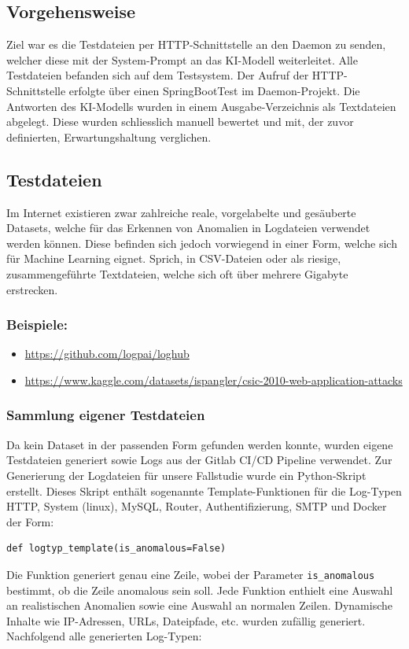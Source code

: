 \documentclass[a4paper,12pt]{report}
\begin{document}
    \subsection{Vorgehensweise}\label{subsec:vorgehensweise}
    Ziel war es die Testdateien per HTTP-Schnittstelle an den Daemon zu senden, welcher diese mit der System-Prompt an das KI-Modell weiterleitet.
    Alle Testdateien befanden sich auf dem Testsystem.
    Der Aufruf der HTTP-Schnittstelle erfolgte über einen SpringBootTest im Daemon-Projekt.
    Die Antworten des KI-Modells wurden in einem Ausgabe-Verzeichnis als Textdateien abgelegt.
    Diese wurden schliesslich manuell bewertet und mit, der zuvor definierten, Erwartungshaltung verglichen.

    \subsection{Testdateien}\label{subsec:testdateien}
    Im Internet existieren zwar zahlreiche reale, vorgelabelte und gesäuberte Datasets, welche für das Erkennen von Anomalien in Logdateien verwendet werden können.
    Diese befinden sich jedoch vorwiegend in einer Form, welche sich für Machine Learning eignet.
    Sprich, in CSV-Dateien oder als riesige, zusammengeführte Textdateien, welche sich oft über mehrere Gigabyte erstrecken.

    \subsubsection{Beispiele:}
    \begin{itemize}
        \item \url{https://github.com/logpai/loghub}
        \item \url{https://www.kaggle.com/datasets/ispangler/csic-2010-web-application-attacks}
    \end{itemize}

    \subsubsection{Sammlung eigener Testdateien}
    Da kein Dataset in der passenden Form gefunden werden konnte, wurden eigene Testdateien generiert sowie Logs aus der Gitlab CI/CD Pipeline verwendet.
    Zur Generierung der Logdateien für unsere Fallstudie wurde ein Python-Skript erstellt.
    Dieses Skript enthält sogenannte Template-Funktionen für die Log-Typen HTTP, System (linux), MySQL, Router, Authentifizierung, SMTP und Docker der Form:
    \begin{verbatim}def logtyp_template(is_anomalous=False)
    \end{verbatim}
    Die Funktion generiert genau eine Zeile, wobei der Parameter \texttt{is\_anomalous} bestimmt, ob die Zeile anomalous sein soll.
    Jede Funktion enthielt eine Auswahl an realistischen Anomalien sowie eine Auswahl an normalen Zeilen.
    Dynamische Inhalte wie IP-Adressen, URLs, Dateipfade, etc. wurden zufällig generiert.
    Nachfolgend alle generierten Log-Typen:
\end{document}
